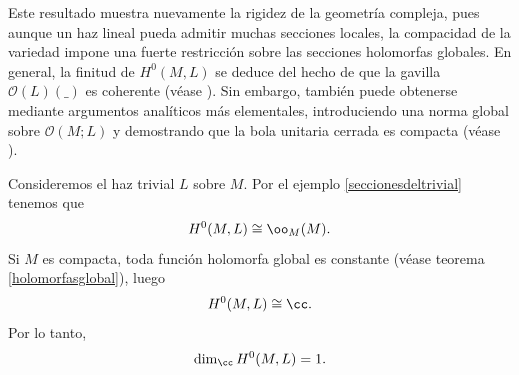 	Este resultado muestra nuevamente la rigidez de la geometría compleja, pues aunque un haz lineal pueda admitir muchas secciones locales, la compacidad de la variedad impone una fuerte restricción sobre las secciones holomorfas globales. En general, la finitud de $H^0(M,L)$ se deduce del hecho de que la gavilla $\mathcal{O}(L)(\_)$ es coherente (véase \parencite[Chap.~VIII, Sec.~A, Cor.~10]{gunningrossi}). Sin embargo, también puede obtenerse mediante argumentos analíticos más elementales, introduciendo una norma global sobre $\mathcal{O}(M;L)$ y demostrando que la bola unitaria cerrada es compacta (véase \parencite[Chap.~3, Sec.~1, Theo.~3.13]{leecomplex}).
	
	\begin{example}\label{H0deltrivial}
		Consideremos el haz trivial $L$ sobre $M$. Por el ejemplo \ref{seccionesdeltrivial} tenemos que
		\begin{equation*}
			H^0(M,L)\cong \oo_M(M).
		\end{equation*} 
		Si $M$ es compacta, toda función holomorfa global es constante (véase teorema \ref{holomorfasglobal}), luego
		\begin{equation*}
			H^0(M,L)\cong\cc.
		\end{equation*}
		Por lo tanto,
		\begin{equation*}
			\dim_\cc H^0(M,L)=1.
		\end{equation*}
	\end{example}
	
